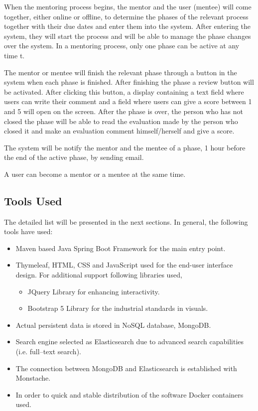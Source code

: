 \documentclass[10pt]{article}
\begin{document}
When the mentoring process begins, the mentor and the user (mentee) will come together,
either online or offline, to determine the phases of the relevant process together with
their due dates and enter them into the system. After entering the system, they will
start the process and will be able to manage the phase changes over the system. In a
mentoring process, only one phase can be active at any time t.

The mentor or mentee will finish the relevant phase through a button in the system when
each phase is finished. After finishing the phase a review button will be activated.
After clicking this button, a display containing a text field where users can write their
comment and a field where users can give a score between 1 and 5 will open on the screen.
After the phase is over, the person who has not closed the phase will be able to read the
evaluation made by the person who closed it and make an evaluation comment himself/herself
and give a score.

The system will be notify the mentor and the mentee of a phase, 1 hour before the end
of the active phase, by sending email.

A user can become a mentor or a mentee at the same time.


\subsection{Tools Used} \label{tools_used}
The detailed list will be presented in the next sections. In general, the following tools
have used:
\begin{itemize}
    \item Maven based Java Spring Boot Framework for the main entry point.
    \item Thymeleaf, HTML, CSS and JavaScript used for the end-user interface design.
    For additional support following libraries used,
    \begin{itemize}
        \item JQuery Library for enhancing interactivity.
        \item Bootstrap 5 Library for the industrial standards in visuals.
    \end{itemize}
    \item Actual persistent data is stored in NoSQL database, MongoDB.
    \item Search engine selected as Elasticsearch due to advanced search capabilities
    (i.e. full--text search).
    \item The connection between MongoDB and Elasticsearch is established with Monstache.
    \item In order to quick and stable distribution of the software Docker containers used.
\end{itemize}
\end{document}
